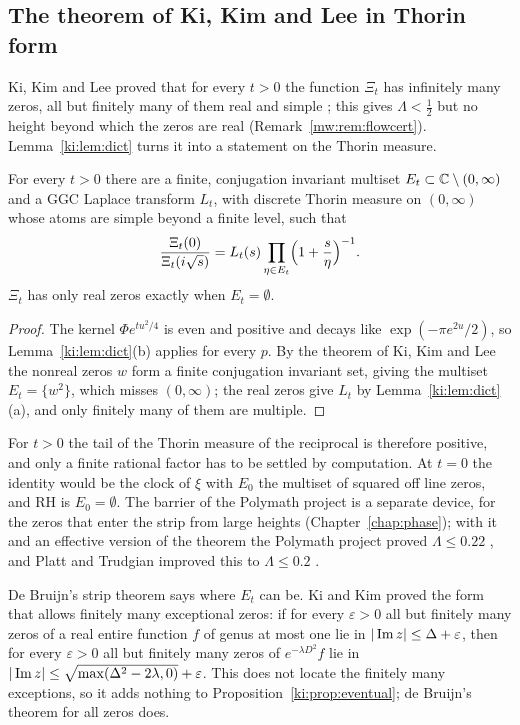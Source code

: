 \subsection{The theorem of Ki, Kim and Lee in Thorin form}\label{ki:sec:kkl}

Ki, Kim and Lee proved that for every $t>0$ the function $\Xi_t$ has infinitely many zeros, all but finitely many of them real and simple \cite{KKL09}; this gives $\Lambda<\tfrac12$ but no height beyond which the zeros are real (Remark~\ref{mw:rem:flowcert}). Lemma~\ref{ki:lem:dict} turns it into a statement on the Thorin measure.

\begin{proposition}\label{ki:prop:eventual}
For every $t>0$ there are a finite, conjugation invariant multiset $E_t\subset\mathbb{C}\setminus(0,\infty)$ and a GGC Laplace transform $L_t$, with discrete Thorin measure on $(0,\infty)$ whose atoms are simple beyond a finite level, such that
\[
\frac{\Xi_t(0)}{\Xi_t(i\sqrt s)}=L_t(s)\prod_{\eta\in E_t}\Bigl(1+\frac{s}{\eta}\Bigr)^{-1}.
\]
$\Xi_t$ has only real zeros exactly when $E_t=\emptyset$.
\end{proposition}

\begin{proof}
The kernel $\Phi e^{tu^2/4}$ is even and positive and decays like $\exp(-\pi e^{2u}/2)$, so Lemma~\ref{ki:lem:dict}(b) applies for every $p$. By the theorem of Ki, Kim and Lee the nonreal zeros $w$ form a finite conjugation invariant set, giving the multiset $E_t=\{w^2\}$, which misses $(0,\infty)$; the real zeros give $L_t$ by Lemma~\ref{ki:lem:dict}(a), and only finitely many of them are multiple.
\end{proof}

For $t>0$ the tail of the Thorin measure of the reciprocal is therefore positive, and only a finite rational factor has to be settled by computation. At $t=0$ the identity would be the clock of $\xi$ with $E_0$ the multiset of squared off line zeros, and RH is $E_0=\emptyset$. The barrier of the Polymath project is a separate device, for the zeros that enter the strip from large heights (Chapter~\ref{chap:phase}); with it and an effective version of the theorem the Polymath project proved $\Lambda\le0.22$ \cite{Polymath}, and Platt and Trudgian improved this to $\Lambda\le0.2$ \cite{PT21}.

De Bruijn's strip theorem says where $E_t$ can be. Ki and Kim \cite{KiKim03} proved the form that allows finitely many exceptional zeros: if for every $\varepsilon>0$ all but finitely many zeros of a real entire function $f$ of genus at most one lie in $|\operatorname{Im} z|\le\Delta+\varepsilon$, then for every $\varepsilon>0$ all but finitely many zeros of $e^{-\lambda D^2}f$ lie in $|\operatorname{Im} z|\le\sqrt{\max(\Delta^2-2\lambda,0)}+\varepsilon$. %
This does not locate the finitely many exceptions, so it adds nothing to Proposition~\ref{ki:prop:eventual}; de Bruijn's theorem for all zeros does.

